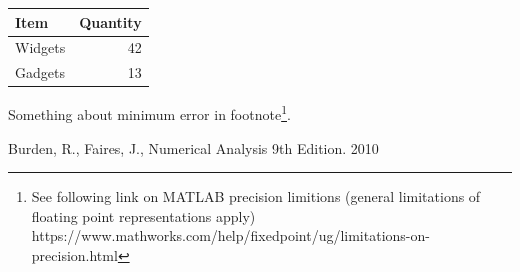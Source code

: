 \documentclass[a4paper]{article}
\begin{document}
\bgroup
\def\arraystretch{1.5}
\begin{center}
	\centering
	\begin{tabular}{l|r}
	\textbf{Item} & \textbf{Quantity} \\
	\hline
	Widgets & 42 \\
	Gadgets & 13
	\end{tabular}
	\label{table1}
\end{center}
\egroup




Something about minimum error in footnote\footnote{See following link on MATLAB precision limitions (general limitations of floating point representations apply) https://www.mathworks.com/help/fixedpoint/ug/limitations-on-precision.html}.




\newpage
\begin{thebibliography}{9}
  Burden, R., Faires, J., Numerical Analysis 9th Edition. 2010

\end{thebibliography}
\end{document}
